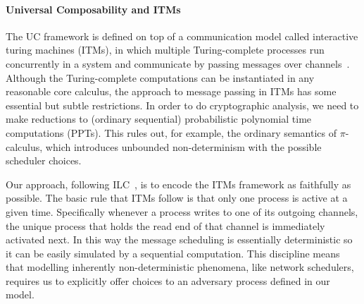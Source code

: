 \paragraph{Universal Composability and ITMs}
The UC framework is defined on top of a communication model called interactive turing machines (ITMs), in which multiple Turing-complete processes run concurrently in a system and communicate by passing messages over channels~\cite{canettiUC}.
Although the Turing-complete computations can be instantiated in any reasonable core calculus, the approach to message passing in ITMs has some essential but subtle restrictions.
In order to do cryptographic analysis, we need to make reductions to (ordinary sequential) probabilistic polynomial time computations (PPTs).
This rules out, for example, the ordinary semantics of $\pi$-calculus, which introduces unbounded non-determinism with the possible scheduler choices.

Our approach, following ILC~\cite{ilc}, is to encode the ITMs framework as faithfully as possible.
The basic rule that ITMs follow is that only one process is active at a given time. 
Specifically whenever a process writes to one of its outgoing channels, the unique process that holds the read end of that channel is immediately activated next.
In this way the message scheduling is essentially deterministic so it can be easily simulated by a sequential computation.
This discipline means that modelling inherently non-deterministic phenomena, like network schedulers, requires us to explicitly offer choices to an adversary process defined in our model.


